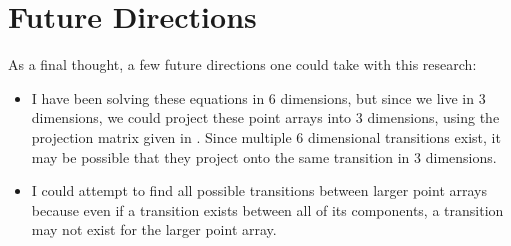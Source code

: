 \documentclass[a4paper,10pt]{article}
\theoremstyle{plain}
\theoremstyle{definition}
\theoremstyle{remark}
\begin{document}
\section{Future Directions}
As a final thought, a few future directions one could take with this research:
\begin{itemize}
    \item I have been solving these equations in 6 dimensions, but since we live in 3 dimensions, we could project these point arrays into 3 dimensions, using the projection matrix given in \cite{indelicatoetal2012}.
    Since multiple 6 dimensional transitions exist, it may be possible that they project onto the same transition in 3 dimensions.
    \item I could attempt to find all possible transitions between larger point arrays because even if a transition exists between all of its components, a transition may not exist for the larger point array.
\end{itemize}

\medskip

\end{document}
